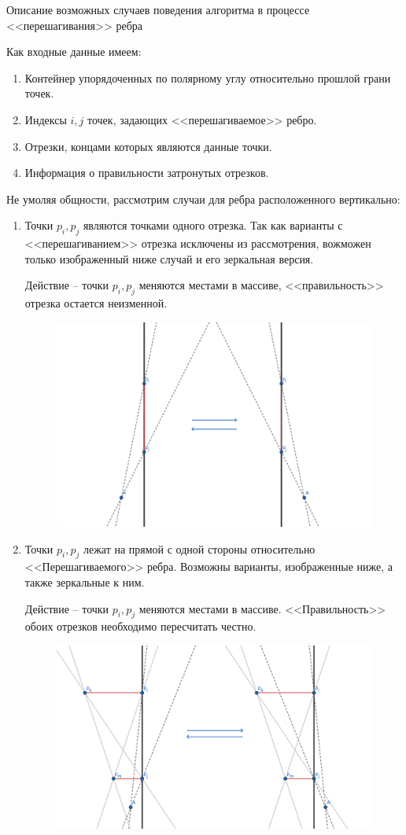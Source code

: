 \documentclass[letterpaper,12pt]{article}
\begin{document}
\begin{center}
Описание возможных случаев поведения алгоритма в процессе <<перешагивания>>
ребра
\end{center}
Как входные данные имеем: 
\begin{enumerate}
      \item Контейнер упорядоченных по полярному углу относительно
            прошлой грани точек.
      \item Индексы $i, j$ точек, задающих <<перешагиваемое>> ребро.
      \item Отрезки, концами которых являются данные точки.
      \item Информация о правильности затронутых отрезков.
\end{enumerate}
Не умоляя общности, рассмотрим случаи для ребра расположенного вертикально:
\begin{enumerate}
      \item Точки $p_i, p_j$ являются точками одного отрезка. Так как
            варианты с <<перешагиванием>> отрезка исключены из рассмотрения,
            вожможен только изображенный ниже случай и его зеркальная версия.
            \par
            Действие -- точки $p_i, p_j$ меняются местами в массиве, 
            <<правильность>> отрезка остается неизменной.
            \begin{figure}[h]
            \centering
            \includegraphics[width=.5\linewidth]{one_segment.png}
            \end{figure}
      \item Точки $p_i, p_j$ лежат на прямой с одной стороны относительно
            <<Перешагиваемого>> ребра. Возможны варианты, изображенные ниже,
            а также зеркальные к ним.
            \par
            Действие -- точки $p_i, p_j$ меняются местами в массиве.
            <<Правильность>> обоих отрезков необходимо пересчитать честно.
            \begin{figure}[H]
            \centering
            \includegraphics[width=.6\linewidth]{one_side_1.png}

\end{figure}
\end{enumerate}
\end{document}
